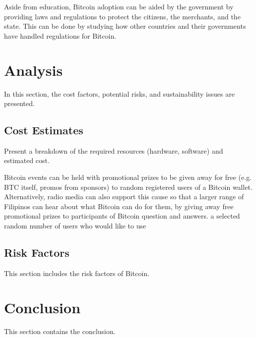 \documentclass{acm_proc_article-sp}
\begin{document}
Aside from education, Bitcoin adoption can be aided by the government by providing laws and regulations to protect the citizens, the merchants, and the state. This can be done by studying how other countries and their governments have handled regulations for Bitcoin.

\section{Analysis}
In this section, the cost factors, potential risks, and sustainability issues are presented.

\subsection{Cost Estimates}
Present a breakdown of the required resources (hardware, software) and estimated cost.

Bitcoin events can be held with promotional prizes to be given away for free (e.g. BTC itself, promos from sponsors) to random registered users of a Bitcoin wallet. Alternatively, radio media can also support this cause so that a larger range of Filipinos can hear about what Bitcoin can do for them, by giving away free promotional prizes to participants of Bitcoin question and answers. a selected random number of users who would like to use 

\subsection{Risk Factors}
This section includes the risk factors of Bitcoin.

\section{Conclusion}
This section contains the conclusion.



  
\end{document}

